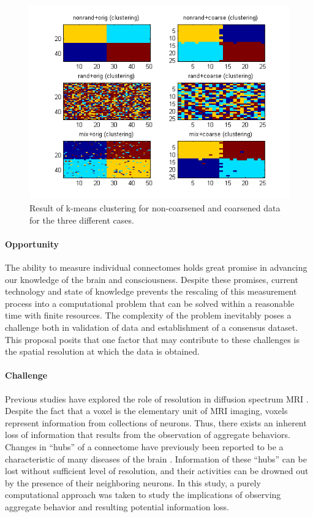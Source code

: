 \documentclass[12pt]{article}
\begin{document}
\begin{figure}[H]
\includegraphics{Fig3.png}
\caption{Result of k-means clustering for non-coarsened and coarsened data for
the three different cases.}
\end{figure}
\newpage

\paragraph{Opportunity}
The ability to measure individual connectomes holds great promise in advancing
our knowledge of the brain and consciousness. Despite these promises, current
technology and state of knowledge prevents the rescaling of this measurement
process into a computational problem that can be solved within a reasonable
time with finite resources. The complexity of the problem inevitably poses a
challenge both in validation of data and establishment of a consensus dataset.
This proposal posits that one factor that may contribute to these challenges is
the spatial resolution at which the data is obtained.

\paragraph{Challenge}
Previous studies have explored the role of resolution in diffusion spectrum MRI
\cite{cammoun2012mapping}. Despite the fact that a voxel is the elementary unit
of MRI imaging, voxels represent information from collections of neurons.
Thus, there exists an inherent loss of information that results from the
observation of aggregate behaviors.  Changes in ``hubs'' of a connectome have
previously been reported to be a characteristic of many diseases of the brain
\cite{crossley2014hubs}. Information of these ``hubs'' can be lost without
sufficient level of resolution, and their activities can be drowned out by the
presence of their neighboring neurons. In this study, a purely computational
approach was taken to study the implications of observing aggregate behavior
and resulting potential information loss.
\end{document}
